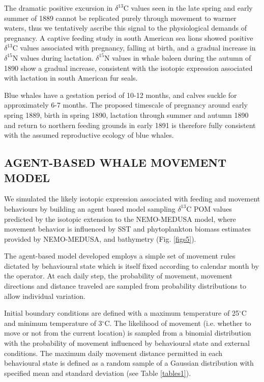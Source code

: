 \documentclass[a4paper,12pt]{article}
\begin{document}
The dramatic positive excursion in $\delta^{13}$C values seen in the late spring and early summer of 1889 cannot be replicated purely through movement to warmer waters, thus we tentatively ascribe this signal to the physiological demands of pregnancy.  
A captive feeding study in south American sea lions\cite{cardona2017temporal} showed positive $\delta^{13}$C values associated with pregnancy, falling at birth, and a gradual increase in $\delta^{15}$N  values during lactation. 
$\delta^{15}$N values in whale baleen during the autumn of 1890 show a gradual increase, consistent with the isotopic expression associated with lactation in south American fur seals\cite{cardona2017temporal}.
 
Blue whales have a gestation period of 10-12 months, and calves suckle for approximately 6-7 months\cite{handbook}. 
The proposed timescale of pregnancy around early spring 1889, birth in spring 1890, lactation through summer and autumn 1890 and return to northern feeding grounds in early 1891 is therefore fully consistent with the assumed reproductive ecology of blue whales.
 
\subsection*{AGENT-BASED WHALE MOVEMENT MODEL}
We simulated the likely isotopic expression associated with feeding and movement behaviours by building an agent based model sampling $\delta^{13}$C POM values predicted by the isotopic extension to the NEMO-MEDUSA model\cite{magozzi2017using,yool2013medusa}, where movement behavior is influenced by SST and phytoplankton biomass estimates provided by NEMO-MEDUSA\cite{yool2013medusa}, and bathymetry (Fig. \ref{figs5}).
 
The agent-based model developed employs a simple set of movement rules dictated by behavioural state which is itself fixed according to calendar month by the operator. 
At each daily step, the probability of movement, movement directions and distance traveled are sampled from probability distributions to allow individual variation.

Initial boundary conditions are defined with a maximum temperature of 25$^{\circ}$C and minimum temperature of 3$^{\circ}$C. The likelihood of movement (i.e. whether to move or not from the current location) is sampled from a binomial distribution with the probability of movement influenced by behavioural state and external conditions. 
The maximum daily movement distance permitted in each behavioural state is defined as a random sample of a Gaussian distribution with specified mean and standard deviation (see Table \ref{tables1}).
 
\end{document}
